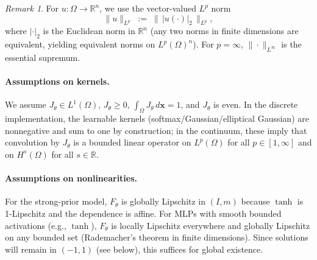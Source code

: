 \documentclass[11pt,a4paper]{article}
\theoremstyle{plain}
\newtheorem{theorem}{Theorem}[section]
\theoremstyle{definition}
\theoremstyle{remark}
\newtheorem{remark}[theorem]{Remark}
\begin{document}
\begin{remark}
	For $u:\Omega\to\mathbb{R}^n$, we use the vector-valued $L^p$ norm
	\[
		\|u\|_{L^p} \;:=\; \big\|\, |u(\cdot)|_2 \,\big\|_{L^p},
	\]
	where $|\cdot|_2$ is the Euclidean norm in $\mathbb{R}^n$ (any two norms in finite dimensions are equivalent, yielding equivalent norms on $L^p(\Omega)^n$). For $p=\infty$, $\|\cdot\|_{L^{\infty}}$ is the essential supremum.
\end{remark}


\paragraph{Assumptions on kernels.}
We assume $J_\theta\in L^1(\Omega)$, $J_\theta\ge 0$, $\int_{\Omega} J_\theta \,d\mathbf{x} = 1$, and $J_\theta$ is even. In the discrete implementation, the learnable kernels (softmax/Gaussian/elliptical Gaussian) are nonnegative and sum to one by construction; in the continuum, these imply that convolution by $J_\theta$ is a bounded linear operator on $L^p(\Omega)$ for all $p\in[1,\infty]$ and on $H^s(\Omega)$ for all $s\in\mathbb{R}$.

\paragraph{Assumptions on nonlinearities.}
For the strong-prior model, $F_\theta$ is globally Lipschitz in $(I,m)$ because $\tanh$ is 1-Lipschitz and the dependence is affine. For MLPs with smooth bounded activations (e.g., $\tanh$), $F_\theta$ is locally Lipschitz everywhere and globally Lipschitz on any bounded set (Rademacher’s theorem in finite dimensions). Since solutions will remain in $(-1,1)$ (see below), this suffices for global existence.





\end{document}
